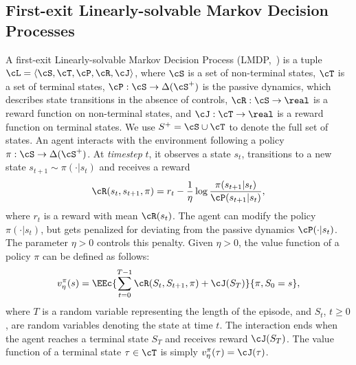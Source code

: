 \subsection{First-exit Linearly-solvable Markov Decision Processes}
A first-exit Linearly-solvable Markov Decision Process (LMDP,~\citet{Todorov2006}) is a tuple
${\cL = \langle\cS,\cT,\cP,\cR,\cJ\rangle}$, where $\cS$ is a set of non-terminal states, $\cT$ is a set of terminal states, ${\cP:\cS\rightarrow\Delta(\cS^+)}$ is the passive dynamics, which describes state transitions in the absence of controls,
${\cR:\cS\rightarrow\real}$ is a reward function on non-terminal states, and ${\cJ:\cT\rightarrow\real}$ is a reward function on terminal states. We use ${S^+=\cS\cup\cT}$ to denote the full set of states.
An agent interacts with the environment following a policy $\pi:\cS\rightarrow\Delta(\cS^+)$.
At \textit{timestep} $t$, it observes a state $s_t$, transitions to a new state $s_{t+1}\sim\pi(\cdot\lvert s_t)$ and receives a reward
\[\cR(s_t, s_{t+1}, \pi) = r_t - \frac 1 \eta\log{\frac{\pi(s_{t+1} \lvert s_t)}{\cP(s_{t+1} \lvert s_t)}},\]
where $r_t$ is a reward with mean $\cR(s_t)$.
The agent can modify the policy $\pi(\cdot\lvert s_t)$, but gets penalized for deviating from the passive dynamics $\cP(\cdot\lvert s_t)$. The parameter $\eta>0$ controls this penalty.
Given $\eta>0$, the value function of a policy $\pi$ can be defined as follows:
\begin{equation}
  v_\eta^\pi(s) = \EEc{\sum_{t=0}^{T-1} \cR(S_t, S_{t+1}, \pi) + \cJ(S_T)}{\pi, S_0 = s},
  \label{eq:value_function_lmdp}
\end{equation}
where $T$ is a random variable representing the length of the episode, and $S_t$, $t\geq 0$, are random variables denoting the state at time $t$. The interaction ends when the agent reaches a terminal state $S_T$ and receives reward $\cJ(S_{T})$. The value function of a terminal state $\tau\in\cT$ is simply
$v_\eta^\pi(\tau) = \cJ(\tau)$. %

